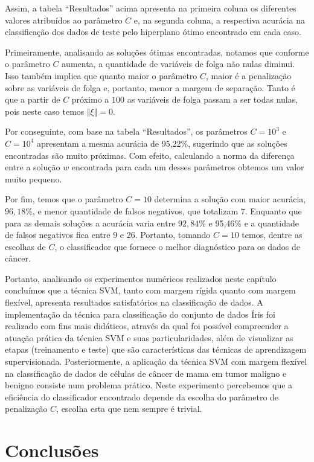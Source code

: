 \documentclass[12pt,a4paper]{scrartcl}
\theoremstyle{definition}%
\begin{document}
Assim, a tabela ``Resultados'' acima apresenta na primeira coluna os
diferentes valores atribuídos ao parâmetro $C$ e, na segunda coluna, a
respectiva acurácia na classificação dos dados de teste pelo hiperplano
ótimo encontrado em cada caso.

Primeiramente, analisando as soluções ótimas encontradas, notamos que
conforme o parâmetro $C$ aumenta, a quantidade de variáveis de folga
não nulas diminui. Isso também implica que quanto maior o parâmetro
$C$, maior é a penalização sobre as variáveis de folga e, portanto,
menor a margem de separação. Tanto é que a partir de $C$ próximo a $100$
as variáveis de folga passam a ser todas nulas, pois neste caso temos
$\Vert \xi \Vert = 0$.

Por conseguinte, com base na tabela ``Resultados'', os parâmetros
$C = 10^{3}$ e $C = 10^{4}$ apresentam a mesma acurácia de 95,22\%,
sugerindo que as soluções encontradas são muito próximas. Com efeito,
calculando a norma da diferença entre a solução $w$ encontrada para
cada um desses parâmetros obtemos um valor muito pequeno.

Por fim, temos que o parâmetro $C = 10$ determina a solução com maior
acurácia, $96,18\%$, e menor quantidade de falsos negativos, que totalizam
7. Enquanto que para as demais soluções a acurácia varia entre $92,84\%$ e
95,46\% e a quantidade de falsos negativos fica entre 9 e 26. Portanto,
tomando $C = 10$ temos, dentre as escolhas de $C$, o classificador
que fornece o melhor diagnóstico para os dados de câncer.

Portanto, analisando os experimentos numéricos realizados neste capítulo concluímos que a técnica SVM, tanto com margem rígida quanto com margem flexível, apresenta resultados satisfatórios na classificação de dados. A implementação da técnica para classificação do conjunto de dados Íris foi realizado com fins mais didáticos, através da qual foi possível compreender a atuação prática da técnica SVM e suas particularidades, além de visualizar as etapas (treinamento e teste) que são características das técnicas de aprendizagem supervisionada. Posteriormente, a aplicação da técnica SVM com margem flexível na classificação de dados de células de câncer de mama em tumor maligno e benigno consiste num problema prático. Neste experimento percebemos que a eficiência do classificador encontrado depende da escolha do parâmetro de penalização $C$, escolha esta que nem sempre é trivial.

\newpage
\section{Conclusões}
\end{document}
